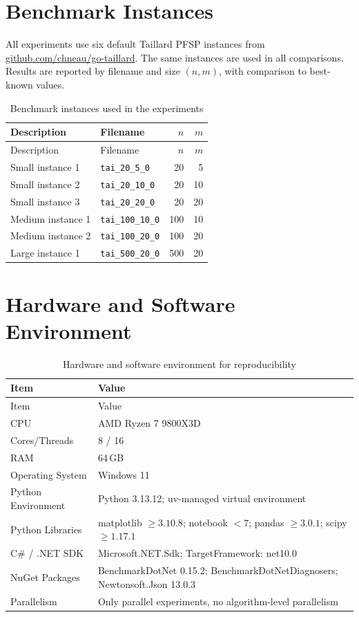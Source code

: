 \documentclass[12pt,a4paper]{report}
\begin{document}
\section{Benchmark Instances}
All experiments use six default Taillard PFSP instances from
\href{https://github.com/chneau/go-taillard}{github.com/chneau/go-taillard}.
The same instances are used in all comparisons. Results are reported by filename and size $(n,m)$, with comparison to best-known values.\\

\begin{longtable}{llrr}
\caption{Benchmark instances used in the experiments}\label{tab:bench_instances}\\
\toprule
Description & Filename & $n$ & $m$ \\
\midrule
\endfirsthead
\toprule
Description & Filename & $n$ & $m$ \\
\midrule
\endhead
Small instance 1 & \texttt{tai\_20\_5\_0} & 20 & 5 \\
Small instance 2 & \texttt{tai\_20\_10\_0} & 20 & 10 \\
Small instance 3 & \texttt{tai\_20\_20\_0} & 20 & 20 \\
Medium instance 1 & \texttt{tai\_100\_10\_0} & 100 & 10 \\
Medium instance 2 & \texttt{tai\_100\_20\_0} & 100 & 20 \\
Large instance 1 & \texttt{tai\_500\_20\_0} & 500 & 20 \\
\bottomrule
\end{longtable}

\section{Hardware and Software Environment}

\begin{longtable}{ll}
\caption{Hardware and software environment for reproducibility}\label{tab:hardware_software}\\
\toprule
Item & Value \\
\midrule
\endfirsthead
\toprule
Item & Value \\
\midrule
\endhead
CPU & AMD Ryzen 7 9800X3D \\
Cores/Threads & 8 / 16 \\
RAM & 64\,GB \\
Operating System & Windows 11 \\
Python Environment & Python 3.13.12; uv-managed virtual environment\\
Python Libraries & matplotlib $\ge 3.10.8$; notebook $< 7$; pandas $\ge 3.0.1$; scipy $\ge 1.17.1$ \\
C\# / .NET SDK & Microsoft.NET.Sdk; TargetFramework: net10.0\\
NuGet Packages & BenchmarkDotNet 0.15.2; BenchmarkDotNetDiagnosers; Newtonsoft.Json 13.0.3 \\
Parallelism & Only parallel experiments, no algorithm-level parallelism \\
\bottomrule
\end{longtable}
\end{document}
